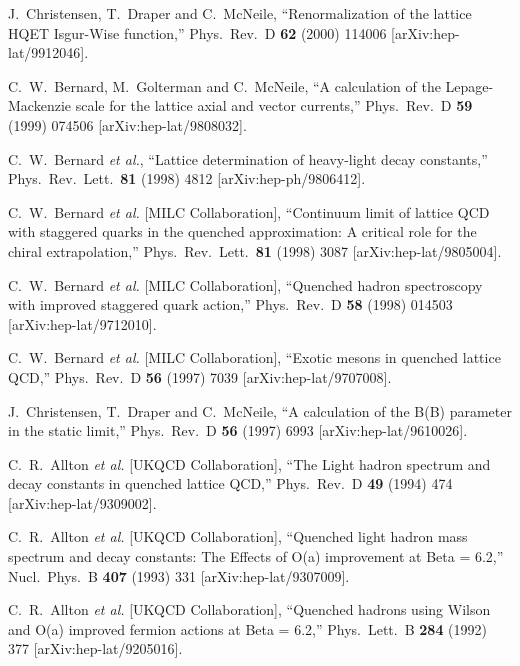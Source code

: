\begin{thebibliography}{130}
J.~Christensen, T.~Draper and C.~McNeile,
``Renormalization of the lattice HQET Isgur-Wise function,''
Phys.\ Rev.\ D {\bf 62} (2000) 114006
[arXiv:hep-lat/9912046].

C.~W.~Bernard, M.~Golterman and C.~McNeile,
``A calculation of the Lepage-Mackenzie scale for the lattice axial and  vector currents,''
Phys.\ Rev.\ D {\bf 59} (1999) 074506
[arXiv:hep-lat/9808032].

C.~W.~Bernard {\it et al.},
``Lattice determination of heavy-light decay constants,''
Phys.\ Rev.\ Lett.\  {\bf 81} (1998) 4812
[arXiv:hep-ph/9806412].

C.~W.~Bernard {\it et al.}  [MILC Collaboration],
``Continuum limit of lattice QCD with staggered quarks in the quenched  approximation: A critical role for the chiral extrapolation,''
Phys.\ Rev.\ Lett.\  {\bf 81} (1998) 3087
[arXiv:hep-lat/9805004].


C.~W.~Bernard {\it et al.}  [MILC Collaboration],
``Quenched hadron spectroscopy with improved staggered quark action,''
Phys.\ Rev.\ D {\bf 58} (1998) 014503
[arXiv:hep-lat/9712010].

C.~W.~Bernard {\it et al.}  [MILC Collaboration],
``Exotic mesons in quenched lattice QCD,''
Phys.\ Rev.\ D {\bf 56} (1997) 7039
[arXiv:hep-lat/9707008].

J.~Christensen, T.~Draper and C.~McNeile,
``A calculation of the B(B) parameter in the static limit,''
Phys.\ Rev.\ D {\bf 56} (1997) 6993
[arXiv:hep-lat/9610026].


C.~R.~Allton {\it et al.}  [UKQCD Collaboration],
``The Light hadron spectrum and decay constants in quenched lattice QCD,''
Phys.\ Rev.\ D {\bf 49} (1994) 474
[arXiv:hep-lat/9309002].

C.~R.~Allton {\it et al.}  [UKQCD Collaboration],
``Quenched light hadron mass spectrum and decay constants: The Effects of O(a) improvement at Beta = 6.2,''
Nucl.\ Phys.\ B {\bf 407} (1993) 331
[arXiv:hep-lat/9307009].


C.~R.~Allton {\it et al.}  [UKQCD Collaboration],
``Quenched hadrons using Wilson and O(a) improved fermion actions at Beta = 6.2,''
Phys.\ Lett.\ B {\bf 284} (1992) 377
[arXiv:hep-lat/9205016].




\end{thebibliography}

